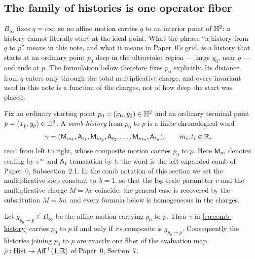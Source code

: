 \subsection{The family of histories is one operator fiber}

\begin{remark}
\label{rem:q-is-a-direction}
$B_\infty$ fixes $q=i\infty$, so no affine motion carries $q$ to an interior
point of $\mathbb{H}^2$: a history cannot literally start at the ideal point.  What the
phrase ``a history from $q$ to $p$'' means in this note, and what it means in
Paper~0's grid, is a history that starts at an ordinary point $p_0$ deep in the
ultraviolet region --- large $y_0$, near $q$ --- and ends at $p$.  The
formulation below therefore fixes $p_0$ explicitly.  Its distance from $q$ enters
only through the total multiplicative charge, and every invariant used in this
note is a function of the charges, not of how deep the start was placed.
\end{remark}

Fix an ordinary starting point $p_0=(x_0,y_0)\in\mathbb{H}^2$ and an ordinary terminal
point $p=(x_p,y_p)\in\mathbb{H}^2$.  A \emph{comb history} from $p_0$ to $p$ is a finite
chronological word
\begin{equation}\label{eq:comb-history}
  \gamma=(\mathsf M_{m_1},\mathsf A_{t_1},\mathsf M_{m_2},\mathsf A_{t_2},\dots,\mathsf M_{m_n},\mathsf A_{t_n}),
  \qquad m_i,t_i\in\mathbb{R} ,
\end{equation}
read from left to right, whose composite motion carries $p_0$ to $p$.  Here
$\mathsf M_{m}$ denotes scaling by $e^{m}$ and $\mathsf A_t$ translation by $t$; the word is
the left-expanded comb of Paper~0, Subsection~2.1.  In the comb notation of this
section we set the multiplicative step constant to $\lambda=1$, so that the
log-scale parameter $v$ and the multiplicative charge $M=\lambda v$ coincide;
the general case is recovered by the substitution $M=\lambda v$, and every
formula below is homogeneous in the charges.

\begin{proposition}
\label{prop:operator-fiber}
Let $g_{p_0\to p}\in B_\infty$ be the affine motion carrying $p_0$ to $p$.  Then
$\gamma$ in \eqref{eq:comb-history} carries $p_0$ to $p$ if and only if its
composite is $g_{p_0\to p}$.  Consequently the histories joining $p_0$ to $p$
are exactly one fiber of the evaluation map
$\rho:\operatorname{Hist}\to\operatorname{Aff}^{+}(1,\mathbb{R})$ of Paper~0, Section~7.
\end{proposition}

